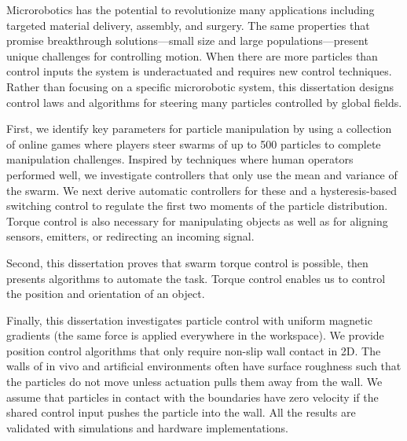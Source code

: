 


Microrobotics has the potential to revolutionize many applications including targeted material delivery, assembly, and surgery.  The same properties that promise breakthrough solutions---small size and large populations---present unique challenges for controlling motion. 
 When there are more particles than control inputs the system is underactuated and requires new control techniques.
 Rather than focusing on a specific microrobotic system, this dissertation designs control laws and algorithms for steering many particles controlled by global fields.

 
 First, we identify key parameters for particle manipulation by using a collection of online games where players steer swarms of up to 500 particles to complete manipulation challenges. Inspired by techniques where human operators performed well, we investigate controllers that only use the mean and variance of the swarm. We next derive automatic controllers for these and a hysteresis-based switching control to regulate the first two moments of the particle distribution. Torque control is also necessary for manipulating objects as well as for aligning sensors, emitters, or redirecting an incoming signal. 
 
 Second, this dissertation proves that swarm torque control is possible, then presents algorithms to automate the task. Torque control enables us to control the position and orientation of an object.
 
 Finally, this dissertation investigates particle control with uniform magnetic gradients (the same force is applied everywhere in the workspace).
 We provide position control algorithms that only require non-slip wall contact in 2D.
 The walls of in vivo and artificial environments often have surface roughness such that the particles do not move unless actuation pulls them away from the wall.
We assume that particles in contact with the boundaries have zero velocity if the shared control input pushes the particle into the wall. 
All the results are validated with simulations and hardware implementations.

